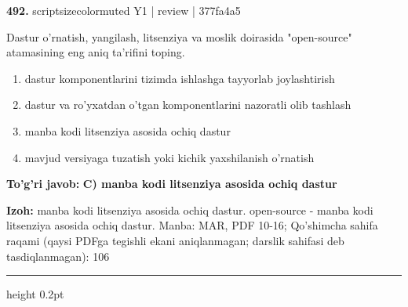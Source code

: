 \documentclass[10pt,a4paper]{article}
\begin{document}
{\bfseries\sffamily\color{ink} 492.} {scriptsizecolor{muted} Y1 | review | 377fa4a5}
\par
Dastur o'rnatish, yangilash, litsenziya va moslik doirasida "open-source" atamasining eng aniq ta'rifini toping.
\begin{enumerate}[label=\Alph*),leftmargin=9mm]
\item dastur komponentlarini tizimda ishlashga tayyorlab joylashtirish
\item dastur va ro'yxatdan o'tgan komponentlarini nazoratli olib tashlash
\item manba kodi litsenziya asosida ochiq dastur
\item mavjud versiyaga tuzatish yoki kichik yaxshilanish o'rnatish
\end{enumerate}
\begin{tcolorbox}[enhanced,breakable,colback=teal!4,colframe=teal!60!black,boxrule=0.45pt,arc=1.2mm,left=2.7mm,right=2.7mm,top=1.8mm,bottom=1.8mm,before skip=2mm,after skip=2mm]
{\bfseries\sffamily\color{teal}To'g'ri javob:} \textbf{C) manba kodi litsenziya asosida ochiq dastur}
\par\smallskip
{\bfseries Izoh:} manba kodi litsenziya asosida ochiq dastur. open-source - manba kodi litsenziya asosida ochiq dastur. Manba: MAR, PDF 10-16; Qo'shimcha sahifa raqami (qaysi PDFga tegishli ekani aniqlanmagan; darslik sahifasi deb tasdiqlanmagan): 106
\end{tcolorbox}
\vspace{2mm}\hrule height 0.2pt\vspace{3mm}
\end{document}
